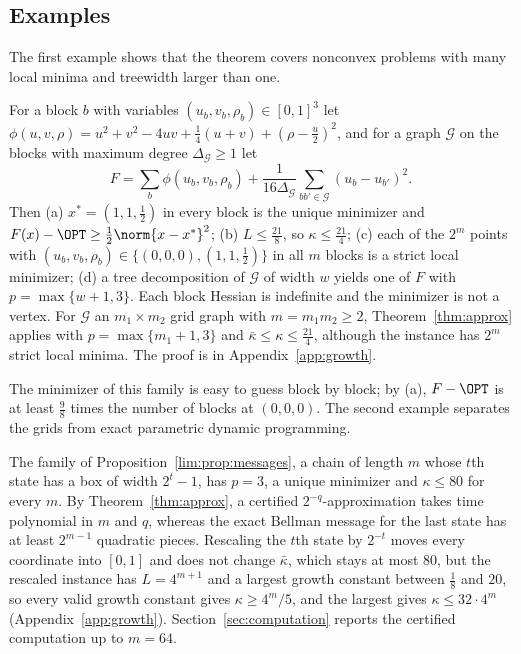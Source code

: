 \subsection{Examples}
The first example shows that the theorem covers nonconvex problems with many
local minima and treewidth larger than one.

\begin{example}\label{ex:family}
For a block $b$ with variables $(u_b,v_b,\rho_b)\in[0,1]^3$ let
$\phi(u,v,\rho)=u^2+v^2-4uv+\frac14(u+v)+(\rho-\frac u2)^2$, and for a graph
$\mathcal G$ on the blocks with maximum degree $\Delta_{\mathcal G}\ge1$ let
\[
F=\sum_b\phi(u_b,v_b,\rho_b)+\frac1{16\Delta_{\mathcal G}}
\sum_{bb'\in\mathcal G}(u_b-u_{b'})^2 .
\]
Then (a) $x^*=(1,1,\frac12)$ in every block is the unique minimizer and
$F(x)-\OPT\ge\frac12\norm{x-x^*}^2$; (b) $L\le\frac{21}8$, so
$\kappa\le\frac{21}4$; (c) each of the $2^m$ points with
$(u_b,v_b,\rho_b)\in\{(0,0,0),(1,1,\frac12)\}$ in all $m$ blocks is a strict
local minimizer; (d) a tree decomposition of $\mathcal G$ of width $w$ yields
one of $F$ with $p=\max\{w+1,3\}$. Each block Hessian is indefinite and the
minimizer is not a vertex. For $\mathcal G$ an $m_1\times m_2$ grid graph
with $m=m_1m_2\ge2$, Theorem~\ref{thm:approx} applies with $p=\max\{m_1+1,3\}$ and
$\bar\kappa\le\kappa\le\frac{21}4$, although the instance has $2^m$ strict
local minima. The proof is in Appendix~\ref{app:growth}.
\end{example}

The minimizer of this family is easy to guess block by block; by (a),
$F-\OPT$ is at least $\frac98$ times the number of blocks at $(0,0,0)$. The
second example separates the grids from exact parametric dynamic
programming.

\begin{example}\label{ex:chain}
The family of Proposition~\ref{lim:prop:messages}, a chain of length $m$
whose $t$th state has a box of width $2^t-1$, has $p=3$, a unique minimizer
and $\kappa\le80$ for every $m$. By Theorem~\ref{thm:approx}, a certified
$2^{-q}$-approximation takes time polynomial in $m$ and $q$, whereas the
exact Bellman message for the last state has at least $2^{m-1}$ quadratic
pieces. Rescaling the $t$th state by $2^{-t}$ moves every coordinate into
$[0,1]$ and does not change $\bar\kappa$, which stays at most $80$, but the
rescaled instance has $L=4^{m+1}$ and a largest growth constant between
$\frac18$ and $20$, so every valid growth constant gives $\kappa\ge4^m/5$,
and the largest gives $\kappa\le32\cdot4^m$ (Appendix~\ref{app:growth}).
Section~\ref{sec:computation} reports the certified computation up to
$m=64$.
\end{example}
